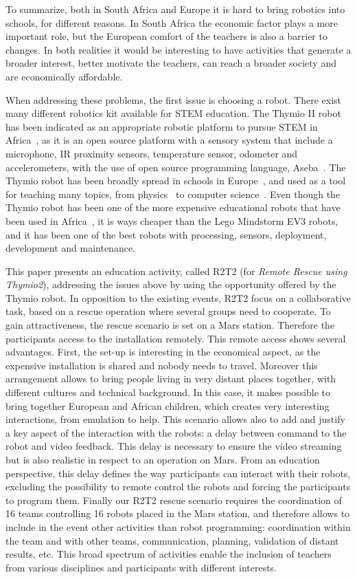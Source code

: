 \documentclass{intech-journal}
\begin{document}
To summarize, both in South Africa and Europe it is hard to bring robotics into schools, for different reasons. 
In South Africa the economic factor plays a more important role, but the European comfort of the teachers is also a barrier to changes.
In both realities it would be interesting to have activities that generate a broader interest, better motivate the teachers, can reach a broader society and are economically affordable.


When addressing these problems, the first issue is choosing a robot.
There exist many different robotics kit available for STEM education. 
The Thymio II robot has been indicated as an appropriate robotic platform to pursue STEM in Africa~\cite{Gyebi2015}, as it is an open source platform with a sensory system that include a microphone, IR proximity sensors, temperature sensor, odometer and accelerometers, with the use of open source programming language, Aseba~\cite{magnenat2010aseba}. 
The Thymio robot has been broadly spread in schools in Europe~\cite{roy2015inirobot}, and used as a tool for teaching many topics, from physics~\cite{Mubin2013} to computer science~\cite{magnenat2014}. 
Even though the Thymio robot has been one of the more expensive educational robots that have been used in Africa~\cite{Gyebi2015}, it is ways cheaper than the Lego Mindstorm EV3 robots, and it has been one of the best robots with processing, sensors, deployment, development and maintenance.


This paper presents an education activity, called R2T2 (for \textit{Remote Rescue using Thymio2}), addressing the issues above by using the opportunity offered by the Thymio robot. 
In opposition to the existing events, R2T2 focus on a collaborative task, based on a rescue operation where several groups need to cooperate.
To gain attractiveness, the rescue scenario is set on a Mars station. 
Therefore the participants access to the installation remotely.
This remote access shows several advantages. 
First, the set-up is interesting in the economical aspect, as the expensive installation is shared and nobody needs to travel.
Moreover this arrangement allows to bring people living in very distant places together, with different cultures and technical background. 
In this case, it makes possible to bring together European and African children, which creates very interesting interactions, from emulation to help.
This scenario allows also to add and justify a key aspect of the interaction with the robots: a delay between command to the robot and video feedback. 
This delay is necessary to ensure the video streaming but is also realistic in respect to an operation on Mars.
From an education perspective, this delay defines the way participants can interact with their robots, excluding the possibility to remote control the robots and forcing the participants to program them.
Finally our R2T2 rescue scenario requires the coordination of 16 teams controlling 16 robots placed in the Mars station, and therefore allows to include in the event other activities than robot programming: coordination within the team and with other teams, communication, planning, validation of distant results, etc.
This broad spectrum of activities enable the inclusion of teachers from various disciplines and participants with different interests.
\end{document}
